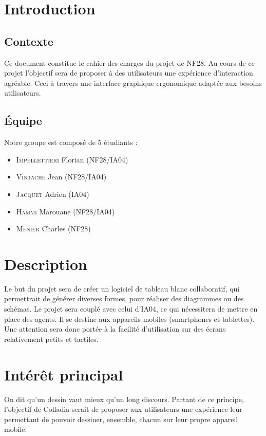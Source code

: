 \documentclass[a4paper,11pt]{article}
\begin{document}


\newpage
\section{Introduction}

\subsection{Contexte}
Ce document constitue le cahier des charges du projet de NF28. Au cours de ce projet l'objectif sera de proposer à des utilisateurs une expérience d'interaction agréable. Ceci à travers une interface graphique ergonomique adaptée aux besoins utilisateurs.

\subsection{Équipe}
Notre groupe est composé de 5 étudiants :
\begin{itemize}
\item \textsc{Impellettieri} Florian (NF28/IA04)
\item \textsc{Vintache} Jean (NF28/IA04)
\item \textsc{Jacquet} Adrien (IA04)
\item \textsc{Hammi} Marouane (NF28/IA04)
\item \textsc{Menier} Charles (NF28)
\end{itemize}



\section{Description}
Le but du projet sera de créer un logiciel de tableau blanc collaboratif, qui permettrait de générer diverses formes, pour réaliser des diagrammes ou des schémas.
Le projet sera couplé avec celui d'IA04, ce qui nécessitera de mettre en place des agents. Il se destine aux appareils mobiles (smartphones et tablettes). Une attention sera donc portée à la facilité d'utilisation sur des écrans relativement petits et tactiles.



\section{Intérêt principal}
On dit qu'un dessin vaut mieux qu'un long discours. Partant de ce principe, l'objectif de Colladia serait de proposer aux utilisateurs une expérience leur permettant de pouvoir dessiner, ensemble, chacun sur leur propre appareil mobile. 
\end{document}
